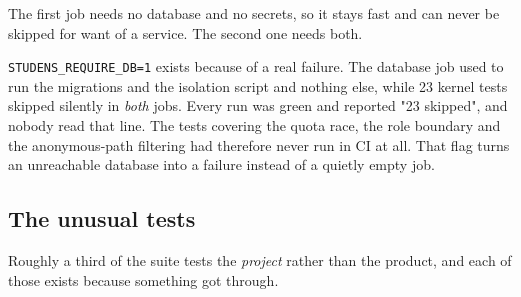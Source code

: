 \documentclass[11pt,a4paper]{article}
\begin{document}
\begin{center}
\end{center}

The first job needs no database and no secrets, so it stays fast and can never
be skipped for want of a service. The second one needs both.

\begin{careful}
\texttt{STUDENS\_REQUIRE\_DB=1} exists because of a real failure. The database
job used to run the migrations and the isolation script and nothing else, while
23 kernel tests skipped silently in \emph{both} jobs. Every run was green and
reported "23 skipped", and nobody read that line. The tests covering the quota
race, the role boundary and the anonymous-path filtering had therefore never
run in CI at all. That flag turns an unreachable database into a failure
instead of a quietly empty job.
\end{careful}

\subsection{The unusual tests}

Roughly a third of the suite tests the \emph{project} rather than the product,
and each of those exists because something got through.
\end{document}
